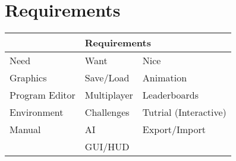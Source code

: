 \section{Requirements}\label{sec:requirements}

\begin{tabular}{|l|l|l|}
\hline
\multicolumn{3}{|c|}{Requirements}\\
\hline
Need & Want & Nice\\
\hline
Graphics & Save/Load & Animation\\
Program Editor & Multiplayer & Leaderboards\\
Environment & Challenges & Tutrial (Interactive)\\
Manual & AI & Export/Import\\
 & GUI/HUD & \\
\hline
\end{tabular}